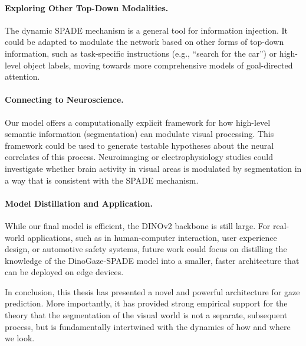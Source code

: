 \paragraph{Exploring Other Top-Down Modalities.} The dynamic SPADE mechanism is a general tool for information injection. It could be adapted to modulate the network based on other forms of top-down information, such as task-specific instructions (e.g., \enquote{search for the car}) or high-level object labels, moving towards more comprehensive models of goal-directed attention.

\paragraph{Connecting to Neuroscience.} Our model offers a computationally explicit framework for how high-level semantic information (segmentation) can modulate visual processing. This framework could be used to generate testable hypotheses about the neural correlates of this process. Neuroimaging or electrophysiology studies could investigate whether brain activity in visual areas is modulated by segmentation in a way that is consistent with the SPADE mechanism.

\paragraph{Model Distillation and Application.} While our final model is efficient, the DINOv2 backbone is still large. For real-world applications, such as in human-computer interaction, user experience design, or automotive safety systems, future work could focus on distilling the knowledge of the DinoGaze-SPADE model into a smaller, faster architecture that can be deployed on edge devices.

In conclusion, this thesis has presented a novel and powerful architecture for gaze prediction. More importantly, it has provided strong empirical support for the theory that the segmentation of the visual world is not a separate, subsequent process, but is fundamentally intertwined with the dynamics of how and where we look.